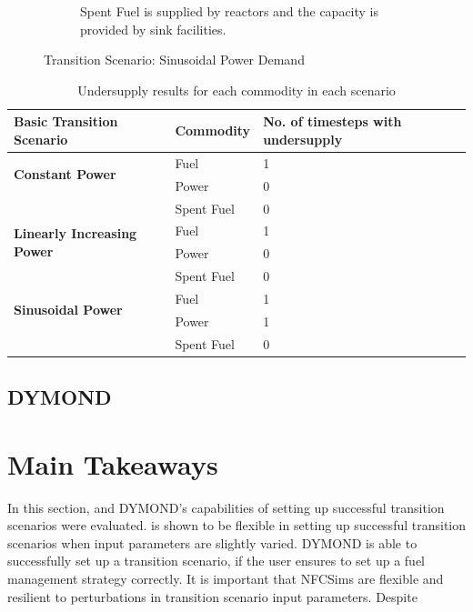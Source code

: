 \begin{figure}[]
\begin{subfigure}[t]{0.65\textwidth}
            \caption{Spent Fuel is supplied by reactors and the capacity is provided by sink facilities.}
            \label{fig:sinetransition-spentfuel}
        \end{subfigure}
        \caption{Transition Scenario: Sinusoidal Power Demand}
    \end{figure}
    
    \begin{table}[]
        \centering
        \caption {Undersupply results for each commodity in each scenario}
        \label{tab:transition-scenario-results}
        \begin{tabular}{|l|l|p{4cm}|}
        \hline
        \textbf{Basic Transition Scenario}    & \textbf{Commodity}    & \textbf{No. of timesteps with undersupply} \\ \hline
        \multirow{2}{*}{\textbf{Constant Power}} & Fuel & 1 \\ \cline{2-3}
                                                 & Power & 0 \\ \cline{2-3}
                                                 & Spent Fuel & 0 \\ \hline
        \multirow{2}{*}{\textbf{Linearly Increasing Power}} & Fuel & 1 \\ \cline{2-3}
                                                 & Power & 0 \\ \cline{2-3}
                                                 & Spent Fuel & 0 \\ \hline
        \multirow{2}{*}{\textbf{Sinusoidal Power}} & Fuel & 1 \\ \cline{2-3}
                                                 & Power & 1 \\ \cline{2-3}
                                                 & Spent Fuel & 0 \\ \hline
        \end{tabular}
    \end{table}

\subsection{DYMOND}

\section{Main Takeaways}
In this section, \Cyclus and DYMOND's capabilities of setting up 
successful transition scenarios were evaluated. 
\Cyclus is shown to be flexible in setting up successful transition 
scenarios when input parameters are slightly varied.
DYMOND is able to successfully set up a transition scenario, if the 
user ensures to set up a fuel management strategy correctly. 
It is important that \glspl{NFCSim} are flexible and resilient to 
perturbations in transition scenario input parameters. 
Despite 

